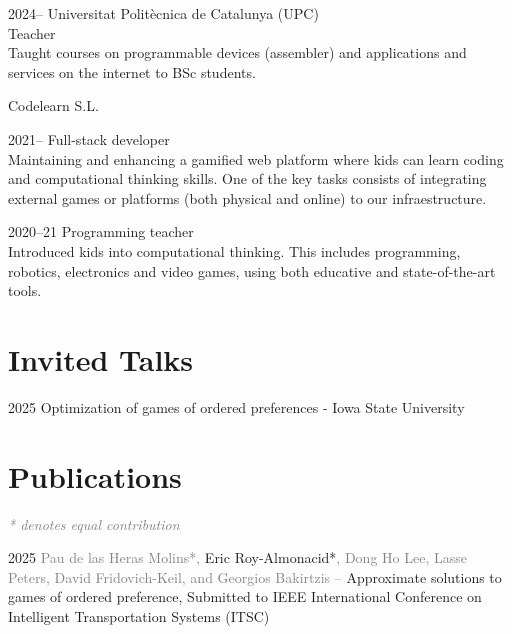\documentclass[a4paper]{report}
\begin{document}
    \begin{tablist}
      \item[2024--] \tab{}Universitat Politècnica de Catalunya (UPC)\\ Teacher\\\smallskip
        Taught courses on programmable devices (assembler) and applications and services on the internet to BSc students.
\vspace{0.5em}
      \item[] \tab{}Codelearn S.L.\vspace{-.25em}
        \item[2021--] \tab{}Full-stack developer\\\smallskip
        Maintaining and enhancing a gamified web platform where kids can learn coding and computational thinking skills. One of the key tasks consists of integrating external games or platforms (both physical and online) to our infraestructure.
       \item[2020--21] \tab{}Programming teacher\\\smallskip
       Introduced kids into computational thinking. This includes programming, robotics, electronics and video games, using both educative and state-of-the-art tools.
    \end{tablist}
\nocite{*}

\vspace{-1em}
\section*{Invited Talks}

\begin{tablist}
    \item[2025] \tab{}Optimization of games of ordered preferences - Iowa State University
\end{tablist}

\vspace{-1em}
\section*{Publications}
\textcolor{gray}{\emph{* denotes equal contribution}}
\vspace{.5em}
\begin{tablist}
    \item[2025] \tab{}\textcolor{gray}{Pau de las Heras Molins*,} Eric Roy-Almonacid*\textcolor{gray}{, Dong Ho Lee, Lasse Peters, David Fridovich-Keil, and Georgios Bakirtzis --} Approximate solutions to games of ordered preference, Submitted to IEEE International Conference on Intelligent Transportation Systems (ITSC)
\end{tablist}
\end{document}
